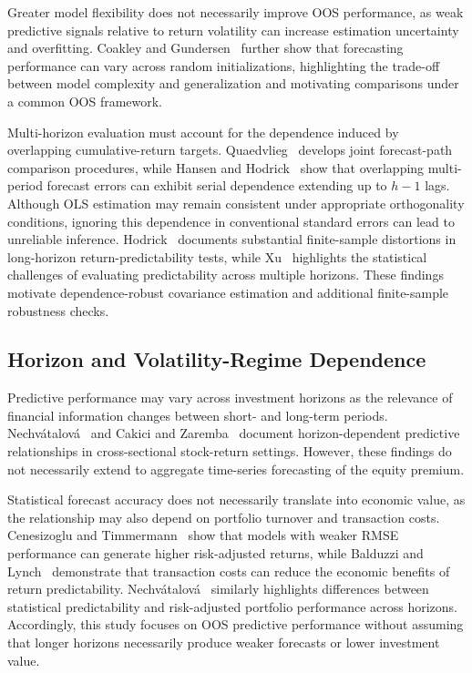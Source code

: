 \documentclass[runningheads,orivec]{llncs}
\begin{document}
Greater model flexibility does not necessarily improve OOS performance, as weak predictive signals relative to return volatility can increase estimation uncertainty and overfitting. Coakley and Gundersen~\cite{coakley2026} further show that forecasting performance can vary across random initializations, highlighting the trade-off between model complexity and generalization and motivating comparisons under a common OOS framework.

Multi-horizon evaluation must account for the dependence induced by overlapping cumulative-return targets. Quaedvlieg~\cite{quaedvlieg2021} develops joint forecast-path comparison procedures, while Hansen and Hodrick~\cite{hansen1980} show that overlapping multi-period forecast errors can exhibit serial dependence extending up to $h-1$ lags. Although OLS estimation may remain consistent under appropriate orthogonality conditions, ignoring this dependence in conventional standard errors can lead to unreliable inference. Hodrick~\cite{hodrick1992} documents substantial finite-sample distortions in long-horizon return-predictability tests, while Xu~\cite{xu2020} highlights the statistical challenges of evaluating predictability across multiple horizons. These findings motivate dependence-robust covariance estimation and additional finite-sample robustness checks.

\subsection{Horizon and Volatility-Regime Dependence}

Predictive performance may vary across investment horizons as the relevance of financial information changes between short- and long-term periods. Nechv{\'a}talov{\'a}~\cite{nechvatalova2024} and Cakici and Zaremba~\cite{cakici2025} document horizon-dependent predictive relationships in cross-sectional stock-return settings. However, these findings do not necessarily extend to aggregate time-series forecasting of the equity premium.

Statistical forecast accuracy does not necessarily translate into economic value, as the relationship may also depend on portfolio turnover and transaction costs. Cenesizoglu and Timmermann~\cite{cenesizoglu2012} show that models with weaker RMSE performance can generate higher risk-adjusted returns, while Balduzzi and Lynch~\cite{balduzzi1999} demonstrate that transaction costs can reduce the economic benefits of return predictability. Nechv{\'a}talov{\'a}~\cite{nechvatalova2024} similarly highlights differences between statistical predictability and risk-adjusted portfolio performance across horizons. Accordingly, this study focuses on OOS predictive performance without assuming that longer horizons necessarily produce weaker forecasts or lower investment value.
\end{document}
